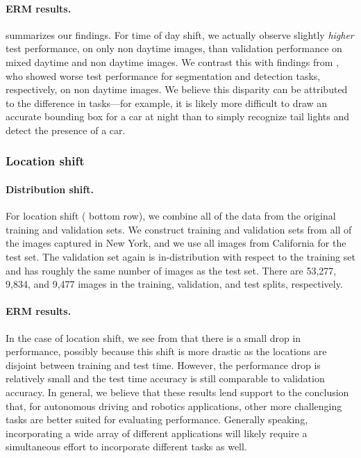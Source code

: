 \paragraph{ERM results.}
 summarizes our findings. For time of day shift, we actually observe
slightly \emph{higher} test performance, on only non daytime images, than validation performance on
mixed daytime and non daytime images. We contrast this with findings from
\citet{dai18itsc,yu20cvpr}, who showed worse test performance for segmentation and detection tasks,
respectively, on non daytime images. We believe this disparity can be attributed to the difference
in tasks---for example, it is likely more difficult to draw an accurate bounding box for a car at
night than to simply recognize tail lights and detect the presence of a car.

\subsubsection{Location shift}

\paragraph{Distribution shift.}
For location shift ( bottom row), we combine all of the data from the
original \BDD training and validation sets. We construct training and validation sets from all of
the images captured in New York, and we use all images from California for the test set. The
validation set again is in-distribution with respect to the training set and has roughly the same
number of images as the test set. There are 53,277, 9,834, and 9,477 images in the training,
validation, and test splits, respectively.

\paragraph{ERM results.}
In the case of location shift, we see from  that there is a small drop in
performance, possibly because this shift is more drastic as the locations are disjoint between
training and test time. However, the performance drop is relatively small and the test time
accuracy is still comparable to validation accuracy. In general, we believe that these results lend
support to the conclusion that, for autonomous driving and robotics applications, other more
challenging tasks are better suited for evaluating performance. Generally speaking, incorporating a
wide array of different applications will likely require a simultaneous effort to incorporate
different tasks as well.
